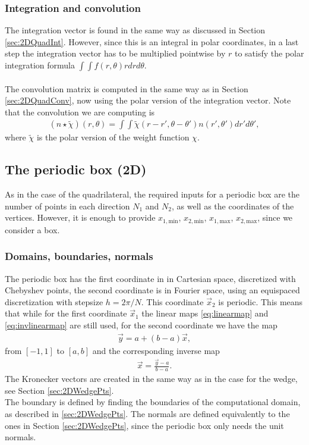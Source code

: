 \documentclass[11pt, a4paper]{article}
\theoremstyle{definition}
\begin{document}
\subsubsection{Integration and convolution}
The integration vector is found in the same way as discussed in Section \ref{sec:2DQuadInt}. However, since this is an integral in polar coordinates, in a last step the integration vector has to be multiplied pointwise by $r$ to satisfy the polar integration formula $\int \int f(r, \theta) r dr d\theta$.
\\
\\
The convolution matrix is computed in the same way as in Section \ref{sec:2DQuadConv}, now using the polar version of the integration vector. 
Note that the convolution we are computing is
\begin{align*}
	\left(n \star \tilde \chi \right) (r, \theta) = \int \int \tilde \chi (r - r', \theta - \theta') n (r',\theta') d r' d\theta',
\end{align*}
where $\tilde \chi$ is the polar version of the weight function $\chi$.
\subsection{The periodic box (2D)}
As in the case of the quadrilateral, the required inputs for a periodic box are the number of points in each direction $N_1$ and $N_2$, as well as the coordinates of the vertices. However, it is enough to provide $x_{1,\text{min}}$, $x_{2,\text{min}}$, $x_{1,\text{max}}$, $x_{2,\text{max}}$, since we consider a box.

\subsubsection{Domains, boundaries, normals}
The periodic box has the first coordinate in in Cartesian space, discretized with Chebyshev points, the second coordinate is in Fourier space, using an equispaced discretization with stepsize $h = 2\pi /N$. This coordinate $\vec x_2$ is periodic. 
This means that while for the first coordinate $\vec x_1$ the linear maps \eqref{eq:linearmap} and \eqref{eq:invlinearmap} are still used, for the second coordinate we have the map 
\begin{align*}
	\vec y = a + (b-a) \vec x, 
\end{align*}
from $[-1,1]$ to $[a,b]$ and the corresponding inverse map
\begin{align*}
   \vec x = \frac{\vec y- a}{b-a}.
\end{align*}
The Kronecker vectors are created in the same way as in the case for the wedge, see Section \ref{sec:2DWedgePts}.
\\
The boundary is defined by finding the boundaries of the computational domain, as described in \ref{sec:2DWedgePts}. The normals are defined equivalently to the ones in Section \ref{sec:2DWedgePts}, since the periodic box only needs the unit normals.
\end{document}
